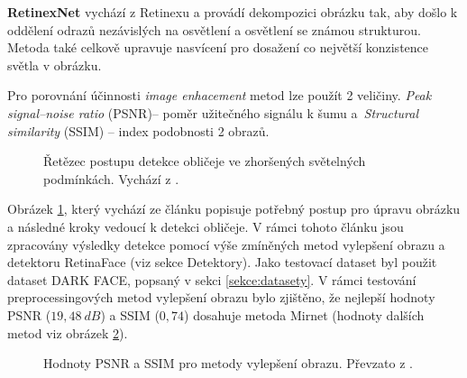 \textbf{RetinexNet} vychází z Retinexu a provádí dekompozici obrázku tak, aby došlo k oddělení odrazů nezávislých na osvětlení a osvětlení se známou strukturou. Metoda také celkově upravuje nasvícení pro dosažení co největší konzistence světla v obrázku.

Pro porovnání účinnosti \emph{image enhacement} metod lze použít 2 veličiny. \emph{Peak signal--noise ratio} (PSNR)-- poměr užitečného signálu k šumu a~\emph{Structural similarity} (SSIM) -- index podobnosti 2 obrazů.

\begin{figure}[H]
  \begin{center}
  \label{obrazek:iepostup}
  \caption{Řetězec postupu detekce obličeje ve zhoršených světelných podmínkách. Vychází z \cite{lowLightFdReview}.}
  \end{center}
\end{figure}

Obrázek \ref{obrazek:iepostup}, který vychází ze článku \cite{lowLightFdReview} popisuje potřebný postup pro úpravu obrázku a následné kroky vedoucí k detekci obličeje. V rámci tohoto článku jsou zpracovány výsledky detekce pomocí výše zmíněných metod vylepšení obrazu a detektoru RetinaFace (viz sekce Detektory). Jako testovací dataset byl použit dataset DARK FACE, popsaný v sekci \ref{sekce:datasety}. V rámci testování preprocessingových metod vylepšení obrazu bylo zjištěno, že nejlepší hodnoty PSNR ($19,48\:dB$) a SSIM ($0,74$) dosahuje metoda Mirnet (hodnoty dalších metod viz obrázek \ref{obrazek:psnrssim}).

\begin{figure}[H]
  \begin{center}
  \label{obrazek:psnrssim}
  \caption{Hodnoty PSNR a SSIM pro metody vylepšení obrazu. Převzato z \cite{lowLightFdReview}.}
  \end{center}
\end{figure}


